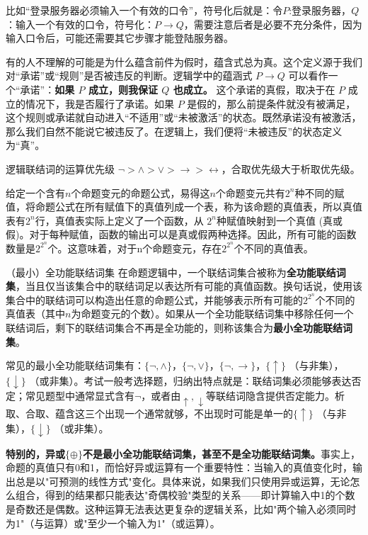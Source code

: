 比如“登录服务器必须输入一个有效的口令”，符号化后就是：令$P$:登录服务器，$Q$：输入一个有效的口令，符号化：$P \rightarrow Q$，需要注意后者是必要不充分条件，因为输入口令后，可能还需要其它步骤才能登陆服务器。

有的人不理解的可能是为什么蕴含前件为假时，蕴含式总为真。这个定义源于我们对“承诺”或“规则”是否被违反的判断。逻辑学中的蕴涵式 $P \rightarrow Q$ 可以看作一个“承诺”：\textbf{如果 $P$ 成立，则我保证 $Q$ 也成立。} 这个承诺的真假，取决于在 $P$ 成立的情况下，我是否履行了承诺。如果 $P$ 是假的，那么前提条件就没有被满足，这个规则或承诺就自动进入“不适用”或“未被激活”的状态。既然承诺没有被激活，那么我们自然不能说它被违反了。在逻辑上，我们便将“未被违反”的状态定义为“真”。
\begin{definition}{逻辑联结词的运算优先级}{}
    $\neg> \land> \lor> \rightarrow> \leftrightarrow$，合取优先级大于析取优先级。
\end{definition}
给定一个含有$n$个命题变元的命题公式，易得这$n$个命题变元共有$2^n$种不同的赋值，将命题公式在所有赋值下的真值列成一个表，称为该命题的真值表，所以真值表有$2^n$行，真值表实际上定义了一个函数，从 $2^n$种赋值映射到一个真值 (真或假)。对于每种赋值，函数的输出可以是真或假两种选择。因此，所有可能的函数数量是$2^{2^n}$个。这意味着，对于n个命题变元，存在$2^{2^n}$个不同的真值表。
\begin{definition}{（最小）全功能联结词集}{}
    在命题逻辑中，一个联结词集合被称为\textbf{全功能联结词集}，当且仅当该集合中的联结词足以表达所有可能的真值函数。换句话说，使用该集合中的联结词可以构造出任意的命题公式，并能够表示所有可能的$2^{2^n}$个不同的真值表（其中$n$为命题变元的个数）。如果从一个全功能联结词集中移除任何一个联结词后，剩下的联结词集合不再是全功能的，则称该集合为\textbf{最小全功能联结词集}。
\end{definition}
常见的最小全功能联结词集有：$\{\neg, \land\}$，$\{\neg, \lor\}$，$\{\neg, \rightarrow\}$，$\{\uparrow\}$ （与非集），$\{\downarrow\}$ （或非集）。考试一般考选择题，归纳出特点就是：联结词集必须能够表达否定；常见题型中通常显式含有$\neg$，或者由$\uparrow,\downarrow$等联结词隐含提供否定能力。析取、合取、蕴含这三个出现一个通常就够，不出现时可能是单一的$\{\uparrow\}$ （与非集），$\{\downarrow\}$ （或非集）。

\textbf{特别的，异或$\{\oplus\}$不是最小全功能联结词集，甚至不是全功能联结词集。}事实上，命题的真值只有0和1，而恰好异或运算有一个重要特性：当输入的真值变化时，输出总是以"可预测的线性方式"变化。具体来说，如果我们只使用异或运算，无论怎么组合，得到的结果都只能表达"奇偶校验"类型的关系——即计算输入中1的个数是奇数还是偶数。这种运算无法表达更复杂的逻辑关系，比如"两个输入必须同时为1"（与运算）或"至少一个输入为1"（或运算）。

